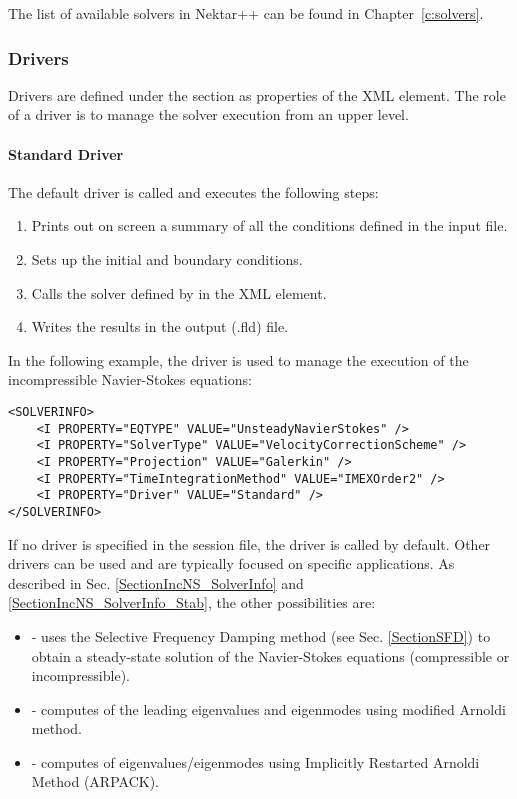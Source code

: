 The list of available solvers in Nektar++ can be found in
Chapter~\ref{c:solvers}.

\subsubsection{Drivers}
Drivers are defined under the  section as properties of the 
 XML element. The role of a driver is to manage the solver 
execution from an upper level. 

\paragraph{Standard Driver}
The default driver is called  
and executes the following steps:
\begin{enumerate}
\item Prints out on screen a summary of all the conditions defined in the input file.
\item Sets up the initial and boundary conditions.
\item Calls the solver defined by   in the  XML element.
\item Writes the results in the output (.fld) file.
\end{enumerate}

In the following example, the driver  is used to manage the 
execution of the incompressible Navier-Stokes equations:
\begin{lstlisting}[style=XMLStyle]
<SOLVERINFO>
    <I PROPERTY="EQTYPE" VALUE="UnsteadyNavierStokes" />
    <I PROPERTY="SolverType" VALUE="VelocityCorrectionScheme" />
    <I PROPERTY="Projection" VALUE="Galerkin" />
    <I PROPERTY="TimeIntegrationMethod" VALUE="IMEXOrder2" />
    <I PROPERTY="Driver" VALUE="Standard" />
</SOLVERINFO>
\end{lstlisting}

If no driver is specified in the session file, the driver  is 
called by default. Other drivers can be used and are typically focused on
specific applications. As described in Sec.
\ref{SectionIncNS_SolverInfo} and  \ref{SectionIncNS_SolverInfo_Stab}, 
the other possibilities are:
\begin{itemize}
\item {} - uses the Selective Frequency Damping method 
(see Sec. \ref{SectionSFD}) to obtain a steady-state solution of the 
Navier-Stokes equations (compressible or incompressible).
\item {}  - computes of the leading eigenvalues and 
eigenmodes using modified Arnoldi method.
\item {} - computes of eigenvalues/eigenmodes using Implicitly 
Restarted Arnoldi Method (ARPACK).
\end{itemize}



